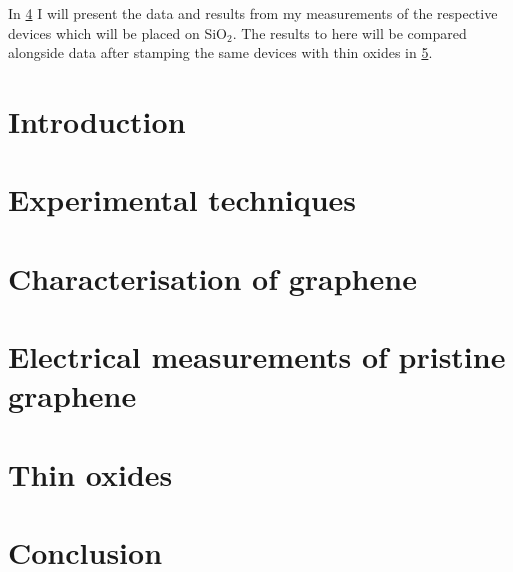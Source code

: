 \documentclass{report}
\begin{document}
	In \cref{chap:baregraphene} I will present the data and results from my measurements of the respective devices which will be placed on SiO$_2$. The results to here will be compared alongside data after stamping the same devices with thin oxides in  \cref{chap:thinoxides}.
	

	\chapter{Introduction}\label{chap:introduction}
	
	
	\chapter{Experimental techniques}\label{chap:experimental_techniques}
	
	
	\chapter{Characterisation of graphene}\label{chap:characterisation}
	
	
	\chapter{Electrical measurements of pristine graphene}\label{chap:baregraphene}
	
	
	\chapter{Thin oxides}\label{chap:thinoxides}
	
	
	\chapter{Conclusion}\label{chap:conclusion}
	
	
\listoffigures
\listoftables
	


\end{document}
